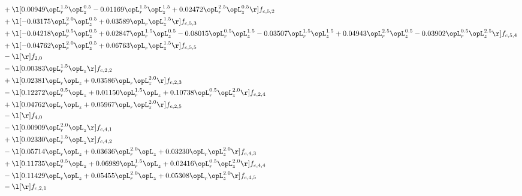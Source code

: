 \begin{alignat}{2}
& + \l[  0.00949 \opL_r^{1.5} \opL_z^{0.5}   -0.01169 \opL_r^{1.5} \opL_z^{1.5} +  0.02472 \opL_r^{2.5} \opL_z^{0.5}  \r] f_{c,5,2} \nonumber \\ 
& + \l[  -0.03175 \opL_r^{2.0} \opL_z^{0.5} +  0.03589 \opL_r \opL_z^{1.5}  \r] f_{c,5,3} \nonumber \\ 
& + \l[  -0.04218 \opL_r^{0.5} \opL_z^{0.5} +  0.02847 \opL_r^{1.5} \opL_z^{0.5}   -0.08015 \opL_r^{0.5} \opL_z^{1.5}   -0.03507 \opL_r^{1.5} \opL_z^{1.5} +  0.04943 \opL_r^{2.5} \opL_z^{0.5}   -0.03902 \opL_r^{0.5} \opL_z^{2.5}  \r] f_{c,5,4} \nonumber \\ 
& + \l[  -0.04762 \opL_r^{2.0} \opL_z^{0.5} +  0.06763 \opL_r \opL_z^{1.5}  \r] f_{c,5,5} \nonumber \\ 
& - \l[  \r] f_{2,0} \nonumber \\ 
& - \l[  0.00383 \opL_r^{1.5} \opL_z  \r] f_{c,2,2} \nonumber \\ 
& + \l[  0.02381 \opL_r \opL_z +  0.03586 \opL_r \opL_z^{2.0}  \r] f_{c,2,3} \nonumber \\ 
& - \l[  0.12272 \opL_r^{0.5} \opL_z +  0.01150 \opL_r^{1.5} \opL_z +  0.10738 \opL_r^{0.5} \opL_z^{2.0}  \r] f_{c,2,4} \nonumber \\ 
& + \l[  0.04762 \opL_r \opL_z +  0.05967 \opL_r \opL_z^{2.0}  \r] f_{c,2,5} \nonumber \\ 
& - \l[  \r] f_{4,0} \nonumber \\ 
& - \l[  0.00909 \opL_r^{2.0} \opL_z  \r] f_{c,4,1} \nonumber \\ 
& + \l[  0.02330 \opL_r^{1.5} \opL_z  \r] f_{c,4,2} \nonumber \\ 
& - \l[  0.05714 \opL_r \opL_z +  0.03636 \opL_r^{2.0} \opL_z +  0.03230 \opL_r \opL_z^{2.0}  \r] f_{c,4,3} \nonumber \\ 
& + \l[  0.11735 \opL_r^{0.5} \opL_z +  0.06989 \opL_r^{1.5} \opL_z +  0.02416 \opL_r^{0.5} \opL_z^{2.0}  \r] f_{c,4,4} \nonumber \\ 
& - \l[  0.11429 \opL_r \opL_z +  0.05455 \opL_r^{2.0} \opL_z +  0.05308 \opL_r \opL_z^{2.0}  \r] f_{c,4,5} \nonumber \\ 
& - \l[  \r] f_{c,2,1} \nonumber \\ 
\end{alignat} 


